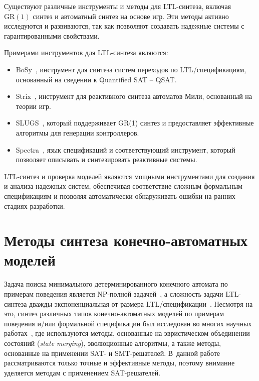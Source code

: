 Существуют различные инструменты и методы для LTL-синтеза, включая $\mathrm{GR}(1)$ синтез и автоматный синтез на основе игр.
Эти методы активно исследуются и развиваются, так как позволяют создавать надежные системы с гарантированными свойствами.

Примерами инструментов для LTL-синтеза являются:
\begin{itemize}
    \item BoSy~\cite{bosy,not-bosy}, инструмент для синтеза систем переходов по LTL\-/спецификациям, основанный на сведении к Quantified SAT \--- QSAT.
    \item Strix~\cite{strix}, инструмент для реактивного синтеза автоматов Мили, основанный на теории игр.
    \item SLUGS~\cite{ehlers2016}, который поддерживает GR(1) синтез и предоставляет эффективные алгоритмы для генерации контроллеров.
    \item Spectra~\cite{maoz2021}, язык спецификаций и соответствующий инструмент, который позволяет описывать и синтезировать реактивные системы.
\end{itemize}

LTL-синтез и проверка моделей являются мощными инструментами для создания и анализа надежных систем, обеспечивая соответствие сложным формальным спецификациям и позволяя автоматически обнаруживать ошибки на ранних стадиях разработки.


\section{Методы синтеза конечно-автоматных моделей}
\label{sub:automata-synthesis}


Задача поиска минимального детерминированного конечного автомата по примерам поведения является NP-полной задачей~\cite{gold}, а сложность задачи LTL-синтеза дважды экспоненциальная от размера LTL\-/спецификации~\cite{rosner-phd}.
Несмотря на это, синтез различных типов конечно-автоматных моделей по примерам поведения и/или формальной спецификации был исследован во многих научных работах~\cite{heule2010,efsm-tools,zakirzyanov2019,buzhinsky-tii,bosy,tsarev-egorov-gecco,giantamidis-tripakis,petrenko,petrenko2,neider,g4ltl-st,smetsers-lata}, где используются методы, основанные на эвристическом объединении состояний (\textit{state merging}), эволюционные алгоритмы, а также методы, основанные на применении SAT- и SMT-решателей.
В~данной работе рассматриваются только точные и эффективные методы, поэтому внимание уделяется методам с применением SAT-решателей.

